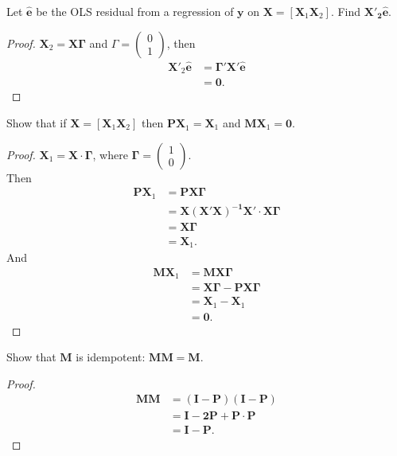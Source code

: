 \documentclass[12pt]{article}
\newenvironment{question}[2][Question]{\begin{trivlist}
\item[\hskip \labelsep {\bfseries #1}\hskip \labelsep {\bfseries #2.}]}{\end{trivlist}}
\begin{document}
\begin{question}{3.4}
Let $\bm{\hat{e}}$ be the OLS residual from a regression of $\bm{y}$ on $\bm{X} = [\bm{X}_1\bm{X}_2]$. Find $\bm{X'_2\hat{e}}$.
\end{question}

\begin{proof}
$\bm{X}_2=\bm{X\Gamma}$ and $\Gamma=\begin{pmatrix}0\\1\end{pmatrix}$, then 
\begin{align*}
  \bm{X'}_2\bm{\hat{e}}&=\bm{\Gamma'X'\hat{e}}\\
  &=\bm{0}.
\end{align*}
\end{proof}

\begin{question}{3.7}
Show that if $\bm{X} = [\bm{X}_1\bm{X}_2]$ then $\bm{PX}_1 = \bm{X}_1$ and $\bm{MX}_1 = \bm{0}$.
\end{question}

\begin{proof}
$\bm{X}_1  = \bm{X}\cdot\bm{\Gamma}$, where $\bm{\Gamma} =\begin{pmatrix}1\\0\end{pmatrix} $.\\
Then \begin{align*}
\bm{PX}_1 &=\bm{PX\Gamma}\\
&=\bm{X(X'X)^{-1}X'}\cdot\bm{X\Gamma}\\
&=\bm{X\Gamma}\\
&=\bm{X}_1.
\end{align*}
And \begin{align*}
\bm{MX}_1 &=\bm{MX\Gamma}\\
&=\bm{X\Gamma}-\bm{PX\Gamma}\\
&= \bm{X}_1 - \bm{X}_1\\
&= \bm{0}.
\end{align*}
\end{proof}

\begin{question}{3.8}
Show that $\bm{M}$ is idempotent: $\bm{MM} =\bm{M}$.
\end{question}

\begin{proof}
\begin{align*}
\bm{MM}&=\bm{(I-P)(I-P)}\\
&=\bm{I-2P+P\cdot P}\\
&=\bm{I-P}.
\end{align*}
\end{proof}
\end{document}
